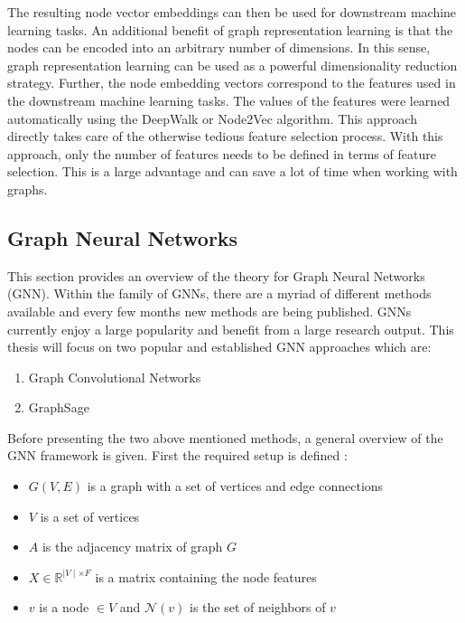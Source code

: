 	\noindent The resulting node vector embeddings can then be used for downstream
	machine learning tasks. An additional benefit of graph representation
	learning is that the nodes can be encoded into an arbitrary number of
	dimensions. In this sense, graph representation learning can be used as a
	powerful dimensionality reduction strategy. Further, the node embedding vectors
	correspond to the features used in the downstream machine learning tasks.
	The values of the features were learned automatically using the DeepWalk or
	Node2Vec algorithm. This approach directly takes care of the otherwise
	tedious feature selection process. With this approach, only the number of
	features needs to be defined in terms of feature selection. This is a large
	advantage and can save a lot of time when working with graphs. 

	\subsection{Graph Neural Networks}

	This section provides an overview of the theory for Graph Neural Networks
	(GNN). Within the family of GNNs, there are a myriad of different methods 
	available and every few months new methods are being published. GNNs 
	currently enjoy a large popularity and benefit from a large research output. 
	This thesis will focus on two popular and established GNN approaches which 
	are:

	\begin{enumerate}
		\item Graph Convolutional Networks
		\item GraphSage
	\end{enumerate}
	
	\noindent Before presenting the two above mentioned methods, a general
	overview of the GNN framework is given. First the required setup is
	defined \citep{leskovec2021lecture}:

	\begin{itemize}
		\setlength\itemsep{0.2em}
		\item $G(V,E)$ is a graph with a set of vertices and edge connections
		\item $V$ is a set of vertices
		\item $A$ is the adjacency matrix of graph $G$
		\item $X \in \mathbb{R}^{\mid V\mid \times F}$ is a matrix containing
			the node features
		\item $v$ is a node $\in V$ and $\mathcal{N}(v)$ is the set of
			neighbors of $v$
	\end{itemize}


